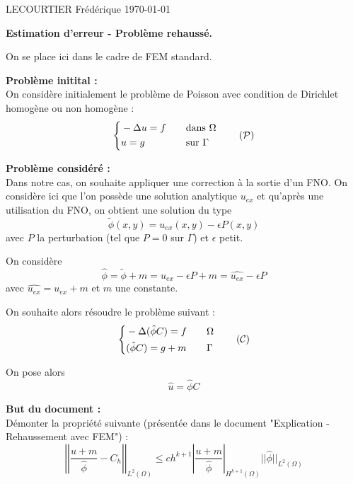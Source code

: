 \documentclass[french]{article}
\begin{document}
	LECOURTIER Frédérique \hfill \today
	\begin{center}
		\Large\textbf{{Estimation d'erreur - Problème rehaussé.}}\\
	\end{center}

	On se place ici dans le cadre de FEM standard. 
	
	\textbf{Problème initital :} \\
	On considère initialement le problème de Poisson avec condition de Dirichlet homogène ou non homogène :
	\begin{equation}
		\left\{\begin{aligned}
			&-\Delta u=f \quad &&\text{dans } \Omega \\
			&u=g \quad &&\text{sur } \Gamma
		\end{aligned}\right. \label{pb_initial} \tag{$\mathcal{P}$}
	\end{equation}

	\textbf{Problème considéré :} \\
	Dans notre cas, on souhaite appliquer une correction à la sortie d'un FNO.
	On considère ici que l'on possède une solution analytique $u_{ex}$ et qu'après une utilisation du FNO, on obtient une solution du type
	$$\tilde{\phi}(x,y) = u_{ex}(x,y)-\epsilon P(x,y)$$
	avec $P$ la perturbation (tel que $P=0$ sur $\Gamma$) et $\epsilon$ petit.
	
	On considère
	$$\hat{\phi}=\tilde{\phi}+m=u_{ex}-\epsilon P+m=\widehat{u_{ex}}-\epsilon P$$
	avec $\widehat{u_{ex}}=u_{ex}+m$ et $m$ une constante.
	
	On souhaite alors résoudre le problème suivant :
	\begin{equation}
		\left\{\begin{aligned}
			&-\Delta (\hat{\phi}C)=f \quad &&\Omega \\
			&(\hat{\phi}C)=g+m \quad &&\Gamma
		\end{aligned}\right. \label{pb_reh} \tag{$\mathcal{C}$}
	\end{equation}

	On pose alors
	$$\hat{u}=\hat{\phi}C$$

	\textbf{But du document :} \\
	Démonter la propriété suivante (présentée dans le document "Explication - Rehaussement avec FEM") :
	\begin{equation}
		\left|\left|\frac{u+m}{\hat{\phi}}-C_h\right|\right|_{L^2(\Omega)}\le ch^{k+1}\left|\frac{u+m}{\hat{\phi}}\right|_{H^{k+1}(\Omega)}||\hat{\phi}||_{L^2(\Omega)}
		\label{ine_a_dem}
	\end{equation}
	
\end{document}
